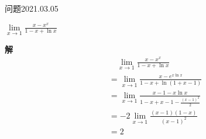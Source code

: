\begin{mybox}{问题2021.03.05}
	
	\qquad $\lim \limits_{x \to 1} \frac{x-x^x}{1-x+\ln x}$
\end{mybox}
\noindent
\textbf{解}
\begin{align*}
	&\quad \lim \limits_{x \to 1} \frac{x-x^x}{1-x+\ln x}\\
	&=\lim \limits_{x \to 1} \frac{x-e^{x\ln x}}{1-x+\ln (1+x-1)}\\
	&=\lim \limits_{x\to 1} \frac{x-1-x\ln x}{1-x+x-1-\frac{(x-1)^2}{2}}\\
	&=-2\lim \limits_{x\to 1}\frac{(x-1)(1-x)}{(x-1)^2}\\
	&=2
\end{align*}
